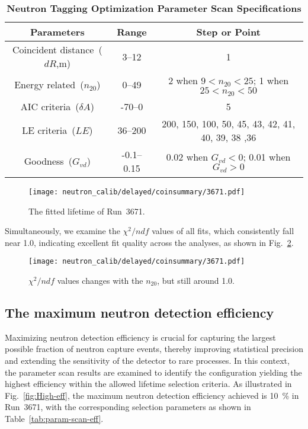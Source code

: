 \begin{table}[htbp]
	\caption{\textbf{Neutron Tagging Optimization Parameter Scan Specifications}}%
	\label{tab:param-scan}
	\centering%
	\begin{tabular}{ccc}
		\toprule%
		Parameters                   & Range      & Step or Point                                     \\
		\midrule%
		Coincident distance~($dR$,m) & 3--12      & 1                                                 \\
		Energy related~($n_{20}$)    & 0--49      & 2 when $9<n_{20}<25$; 1 when $25<n_{20}<50$       \\
		AIC criteria~($\delta A$)    & -70--0     & 5                                                 \\
		LE criteria~($LE$)           & 36--200    & 200, 150, 100, 50, 45, 43, 42, 41, 40, 39, 38 ,36 \\
		Goodness~($G_{vd}$)          & -0.1--0.15 & 0.02 when $G_{vd}<0$; 0.01 when $G_{vd}>0$        \\
		\bottomrule
	\end{tabular}
\end{table}
\begin{figure}[htbp]
	\centering
	\texttt{[image: neutron\_calib/delayed/coinsummary/3671.pdf]}
	\caption{The fitted lifetime of Run~3671.}
	\label{fig:lifetime3671}
\end{figure}
Simultaneously, we examine the $\chi^2/ndf$ values of all fits, which consistently fall near 1.0, indicating excellent fit quality across the analyses, as shown in Fig.~\ref{fig:chi2}.
\begin{figure}[H]
	\centering
	\texttt{[image: neutron\_calib/delayed/coinsummary/3671.pdf]}
	\caption{$\chi^2/ndf$ values changes with the $n_{20}$, but still around 1.0.}
	\label{fig:chi2}
\end{figure}

\subsection{The maximum neutron detection efficiency}
Maximizing neutron detection efficiency is crucial for capturing the largest possible fraction of neutron capture events, thereby improving statistical precision and extending the sensitivity of the detector to rare processes. In this context, the parameter scan results are examined to identify the configuration yielding the highest efficiency within the allowed lifetime selection criteria. As illustrated in Fig.~\ref{fig:High-eff}, the maximum neutron detection efficiency achieved is \SI{10}{\%} in Run~3671, with the corresponding selection parameters as shown in Table~\ref{tab:param-scan-eff}.

